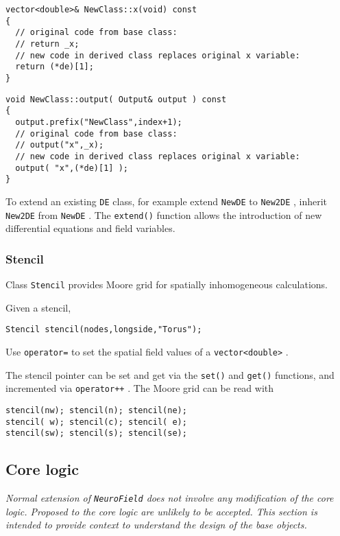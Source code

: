 \documentclass[12pt,a4paper]{article}
\newcommand{\type}[1]{ {\small\small\tt #1} }
\newcommand{\NF}[0]{ \type{NeuroField}}
\begin{document}
\begin{lstlisting}
vector<double>& NewClass::x(void) const
{
  // original code from base class:
  // return _x;
  // new code in derived class replaces original x variable:
  return (*de)[1];
}
\end{lstlisting}

\begin{lstlisting}
void NewClass::output( Output& output ) const
{
  output.prefix("NewClass",index+1);
  // original code from base class:
  // output("x",_x);
  // new code in derived class replaces original x variable:
  output( "x",(*de)[1] );
}
\end{lstlisting}

To extend an existing \type{DE} class, for example extend \type{NewDE} to \type{New2DE}, inherit \type{New2DE} from \type{NewDE}. The \type{extend()} function allows the introduction of new differential equations and field variables.

\subsubsection{Stencil}
\label{sec:stencil}

Class \type{Stencil} provides Moore grid for spatially inhomogeneous calculations.

Given a stencil,
\begin{lstlisting}
Stencil stencil(nodes,longside,"Torus");
\end{lstlisting}

Use \type{operator=} to set the spatial field values of a \type{vector<double>}.

The stencil pointer can be set and get via the \type{set()} and \type{get()} functions, and incremented via \type{operator++}. The Moore grid can be read with
\begin{lstlisting}
stencil(nw); stencil(n); stencil(ne);
stencil( w); stencil(c); stencil( e);
stencil(sw); stencil(s); stencil(se);
\end{lstlisting}

\subsection{Core logic}

{\em Normal extension of \NF does not involve any modification of the core logic. Proposed to the core logic are unlikely to be accepted. This section is intended to provide context to understand the design of the base objects.}
\end{document}

